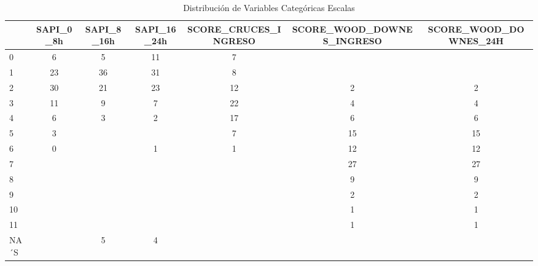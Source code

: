\begin{landscape}
\begin{table}[h]
    \centering
    \caption{Distribución de Variables Categóricas Escalas}
    \begin{tabular}{lcccccc}
    \hline
        ~ & SAPI\_0\_8h & SAPI\_8\_16h & SAPI\_16\_24h & SCORE\_CRUCES\_INGRESO & SCORE\_WOOD\_DOWNES\_INGRESO & SCORE\_WOOD\_DOWNES\_24H  \\ \hline
        0 & 6 & 5 & 11 & 7 & ~ &   \\ \hline
        1 & 23 & 36 & 31 & 8 & ~ &   \\ \hline
        2 & 30 & 21 & 23 & 12 & 2 & 2  \\ \hline
        3 & 11 & 9 & 7 & 22 & 4 & 4  \\ \hline
        4 & 6 & 3 & 2 & 17 & 6 & 6  \\ \hline
        5 & 3 & ~ & ~ & 7 & 15 & 15  \\ \hline
        6 & 0 & ~ & 1 & 1 & 12 & 12  \\ \hline
        7 & ~ & ~ & ~ & ~ & 27 & 27  \\ \hline
        8 & ~ & ~ & ~ & ~ & 9 & 9  \\ \hline
        9 & ~ & ~ & ~ & ~ & 2 & 2  \\ \hline
        10 & ~ & ~ & ~ & ~ & 1 & 1  \\ \hline
        11 & ~ & ~ & ~ & ~ & 1 & 1  \\ \hline
        NA´S & ~ & 5 & 4 & ~ & ~ &   \\ \hline
    \end{tabular}
    \label{tabla:distribucion_variables_categoricas_escalas}
\end{table}

\end{landscape}
\restoregeometry 


    
    
